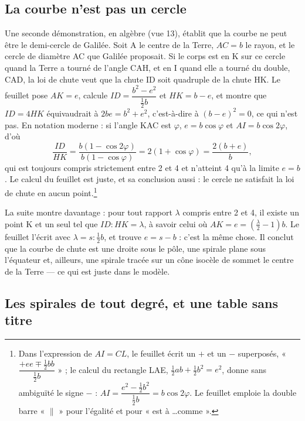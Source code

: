 \documentclass[11pt,a4paper]{article}
\begin{document}
\subsection*{La courbe n'est pas un cercle}

Une seconde démonstration, en algèbre (vue 13), établit que la courbe ne peut
être le demi-cercle de Galilée. Soit A le centre de la Terre, $AC = b$ le rayon,
et le cercle de diamètre AC que Galilée proposait. Si le corps est en K sur ce
cercle quand la Terre a tourné de l'angle CAH, et en I quand elle a tourné
du double, CAD, la loi de chute veut que la chute ID soit quadruple de la chute
HK. Le feuillet pose $AK = e$, calcule $ID = \dfrac{b^2 - e^2}{\frac12 b}$ et
$HK = b - e$, et montre que $ID = 4HK$ équivaudrait à $2be = b^2 + e^2$,
c'est-à-dire à $(b - e)^2 = 0$, ce qui n'est pas. En notation moderne : si
l'angle KAC est $\varphi$, $e = b\cos\varphi$ et $AI = b\cos2\varphi$, d'où
\[
\frac{ID}{HK} = \frac{b(1-\cos2\varphi)}{b(1-\cos\varphi)}
 = 2(1+\cos\varphi) = \frac{2(b+e)}{b},
\]
qui est toujours compris strictement entre 2 et 4 et n'atteint 4 qu'à la
limite $e = b$. Le calcul du feuillet est juste, et sa conclusion aussi : le
cercle ne satisfait la loi de chute en aucun point.\footnote{Dans
l'expression de $AI = CL$, le feuillet écrit un $+$ et un $-$ superposés,
« $\dfrac{+ee \mp \frac12 bb}{\frac12 b}$ » ; le calcul du rectangle LAE,
$\frac12 ab + \frac12 b^2 = e^2$, donne sans ambiguïté le signe $-$ :
$AI = \dfrac{e^2 - \frac12 b^2}{\frac12 b} = b\cos2\varphi$. Le feuillet emploie
la double barre « $\parallel$ » pour l'égalité et pour « est à \dots comme ».}

La suite montre davantage : pour tout rapport $\lambda$ compris entre 2 et 4,
il existe un point K et un seul tel que $ID : HK = \lambda$, à savoir celui où
$AK = e = (\frac{\lambda}{2} - 1)b$. Le feuillet l'écrit avec
$\lambda = s : \frac12 b$, et trouve $e = s - b$ : c'est la même chose. Il
conclut que la courbe de chute est une droite sous le pôle, une spirale plane
sous l'équateur et, ailleurs, une spirale tracée sur un cône isocèle de sommet
le centre de la Terre — ce qui est juste dans le modèle.

\subsection*{Les spirales de tout degré, et une table sans titre}
\end{document}
